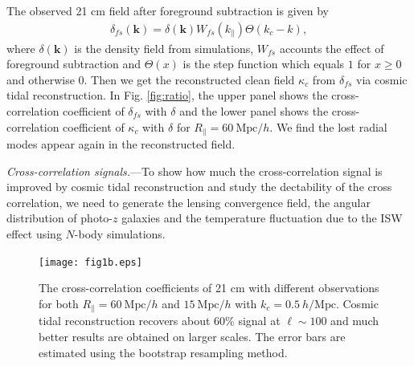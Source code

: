 \documentclass[aps,prl,twocolumn,showpacs,superscriptaddress,groupedaddress,nofootinbib,floatfix]{revtex4}  %
\newcommand{\mr}{\mathrm}
\begin{document}
The observed 21 cm field after foreground subtraction is given by 
\begin{eqnarray}
\delta_{fs}(\bm{k})=\delta(\bm{k})W_{fs}(k_\parallel)\Theta(k_c-k),
\end{eqnarray}
where $\delta(\bm{k})$ is the density field from simulations, $W_{fs}$ accounts
the effect of foreground subtraction and $\Theta(x)$ is the step function 
which equals $1$ for $x\ge0$ and otherwise $0$.
Then we get the reconstructed clean field $\kappa_c$ from $\delta_{fs}$ via
cosmic tidal reconstruction. In Fig. \ref{fig:ratio}, the upper panel shows the 
cross-correlation coefficient of $\delta_{fs}$ with $\delta$ and the lower 
panel shows the cross-correlation coefficient of $\kappa_c$ with $\delta$ for 
$R_\parallel=60\ \mr{Mpc}/h$. 
We find the lost radial modes appear again in the reconstructed field.

{\it Cross-correlation signals.}---To show how much the cross-correlation signal
is improved by cosmic tidal reconstruction and study the dectability of the
cross correlation, we need to generate the lensing convergence field,
the angular distribution of photo-$z$ galaxies and the temperature fluctuation
due to the ISW effect using $N$-body simulations.

\begin{figure}[tbp]
\begin{center}
\texttt{[image: fig1b.eps]}
\end{center}
\vspace{-0.7cm}
\caption{The cross-correlation coefficients of 21 cm with different 
observations for both $R_\parallel=60\ \mr{Mpc}/h$ and $15\ \mr{Mpc}/h$ with 
$k_c=0.5\ h/\mr{Mpc}$. Cosmic tidal reconstruction recovers about 60\% signal 
at $\ell\sim100$ and much better results are obtained on larger scales. 
The error bars are estimated using the bootstrap resampling method.}
\label{fig:cc}
\end{figure}

\end{document}
